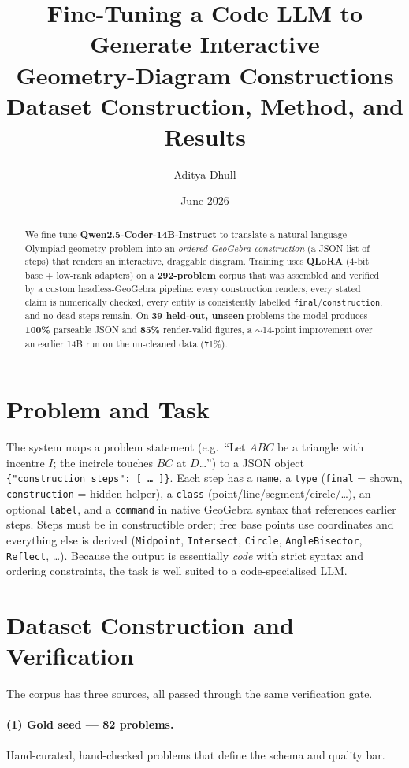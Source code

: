 \documentclass[11pt]{article}
\title{\textbf{Fine-Tuning a Code LLM to Generate Interactive\\
Geometry-Diagram Constructions}\\[4pt]
\large Dataset Construction, Method, and Results}
\author{Aditya Dhull}
\date{June 2026}
\begin{document}
\maketitle

\begin{abstract}
\noindent We fine-tune \textbf{Qwen2.5-Coder-14B-Instruct} to translate a
natural-language Olympiad geometry problem into an \emph{ordered GeoGebra
construction} (a JSON list of steps) that renders an interactive, draggable
diagram. Training uses \textbf{QLoRA} (4-bit base + low-rank adapters) on a
\textbf{292-problem} corpus that was assembled and verified by a custom
headless-GeoGebra pipeline: every construction renders, every stated claim is
numerically checked, every entity is consistently labelled
\texttt{final}/\texttt{construction}, and no dead steps remain. On
\textbf{39 held-out, unseen} problems the model produces \textbf{100\%}
parseable JSON and \textbf{85\%} render-valid figures, a $\sim$14-point
improvement over an earlier 14B run on the un-cleaned data (71\%).
\end{abstract}

\section{Problem and Task}
The system maps a problem statement (e.g.\ ``Let $ABC$ be a triangle with
incentre $I$; the incircle touches $BC$ at $D$\ldots'') to a JSON object
\texttt{\{"construction\_steps": [\,\ldots\,]\}}. Each step has a \texttt{name},
a \texttt{type} (\texttt{final} = shown, \texttt{construction} = hidden helper),
a \texttt{class} (point/line/segment/circle/\ldots), an optional \texttt{label},
and a \texttt{command} in native GeoGebra syntax that references earlier steps.
Steps must be in constructible order; free base points use coordinates and
everything else is derived (\texttt{Midpoint}, \texttt{Intersect},
\texttt{Circle}, \texttt{AngleBisector}, \texttt{Reflect}, \ldots). Because the
output is essentially \emph{code} with strict syntax and ordering constraints,
the task is well suited to a code-specialised LLM.

\section{Dataset Construction and Verification}
The corpus has three sources, all passed through the same verification gate.

\paragraph{(1) Gold seed --- 82 problems.} Hand-curated, hand-checked problems
that define the schema and quality bar.
\end{document}
